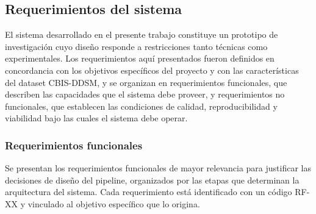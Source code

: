 
\subsection{Requerimientos del sistema}
\label{sec:requerimientos}

El sistema desarrollado en el presente trabajo constituye un prototipo de 
investigación cuyo diseño responde a restricciones tanto técnicas como 
experimentales. Los requerimientos aquí presentados fueron definidos en 
concordancia con los objetivos específicos del proyecto y con las 
características del dataset CBIS-DDSM, y se organizan en requerimientos 
funcionales, que describen las capacidades que el sistema debe proveer,
y requerimientos no funcionales, que establecen las condiciones de calidad, 
reproducibilidad y viabilidad bajo las cuales el sistema debe operar.

\subsubsection{Requerimientos funcionales}

Se presentan los requerimientos funcionales de mayor relevancia
para justificar las decisiones de diseño del pipeline,
organizados por las etapas que determinan la arquitectura
del sistema. Cada requerimiento está identificado con un
código RF-XX y vinculado al objetivo específico que lo origina.

